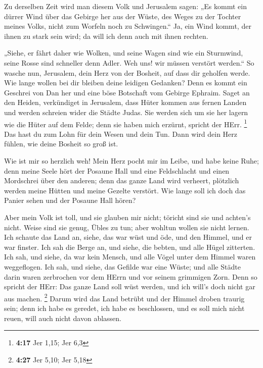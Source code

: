  Zu derselben Zeit wird man diesem Volk und Jerusalem
sagen: „Es kommt ein dürrer Wind über das Gebirge her aus der Wüste, des
Weges zu der Tochter meines Volks, nicht zum Worfeln noch zu
Schwingen.``  Ja, ein Wind kommt, der ihnen zu stark sein
wird; da will ich denn auch mit ihnen rechten.

 „Siehe, er fährt daher wie Wolken, und seine Wagen sind
wie ein Sturmwind, seine Rosse sind schneller denn Adler. Weh uns! wir
müssen verstört werden.``  So wasche nun, Jerusalem, dein
Herz von der Bosheit, auf dass dir geholfen werde. Wie lange wollen bei
dir bleiben deine leidigen Gedanken?  Denn es kommt ein
Geschrei von Dan her und eine böse Botschaft vom Gebirge Ephraim.
 Saget an den Heiden, verkündiget in Jerusalem, dass Hüter
kommen aus fernen Landen und werden schreien wider die Städte Judas.
 Sie werden sich um sie her lagern wie die Hüter auf dem
Felde; denn sie haben mich erzürnt, spricht der HErr. \footnote{\textbf{4:17}
  Jer 1,15; Jer 6,3}  Das hast du zum Lohn für dein Wesen
und dein Tun. Dann wird dein Herz fühlen, wie deine Bosheit so groß ist.

 Wie ist mir so herzlich weh! Mein Herz pocht mir im Leibe,
und habe keine Ruhe; denn meine Seele hört der Posaune Hall und eine
Feldschlacht  und einen Mordschrei über den anderen; denn
das ganze Land wird verheert, plötzlich werden meine Hütten und meine
Gezelte verstört.  Wie lange soll ich doch das Panier sehen
und der Posaune Hall hören?

 Aber mein Volk ist toll, und sie glauben mir nicht;
töricht sind sie und achten's nicht. Weise sind sie genug, Übles zu tun;
aber wohltun wollen sie nicht lernen.  Ich schaute das Land
an, siehe, das war wüst und öde, und den Himmel, und er war finster.
 Ich sah die Berge an, und siehe, die bebten, und alle
Hügel zitterten.  Ich sah, und siehe, da war kein Mensch,
und alle Vögel unter dem Himmel waren weggeflogen.  Ich
sah, und siehe, das Gefilde war eine Wüste; und alle Städte darin waren
zerbrochen vor dem HErrn und vor seinem grimmigen Zorn. 
Denn so spricht der HErr: Das ganze Land soll wüst werden, und ich
will's doch nicht gar aus machen. \footnote{\textbf{4:27} Jer 5,10; Jer
  5,18}  Darum wird das Land betrübt und der Himmel droben
traurig sein; denn ich habe es geredet, ich habe es beschlossen, und es
soll mich nicht reuen, will auch nicht davon ablassen.

